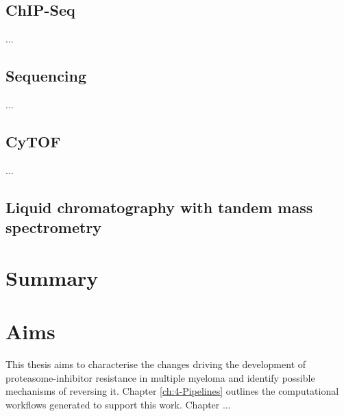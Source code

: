 \subsection{ChIP-Seq}
...

\subsection{Sequencing}
...

\subsection{CyTOF}\label{subsec:cytof-intro}
...


\subsection{Liquid chromatography with tandem mass spectrometry}\label{subsec:lcmsms-intro}

\section{Summary}

\section{Aims}
This thesis aims to characterise the changes driving the development of proteasome-inhibitor resistance in multiple myeloma and identify possible mechanisms of reversing it.
Chapter \ref{ch:4-Pipelines} outlines the computational workflows generated to support this work.
Chapter ...